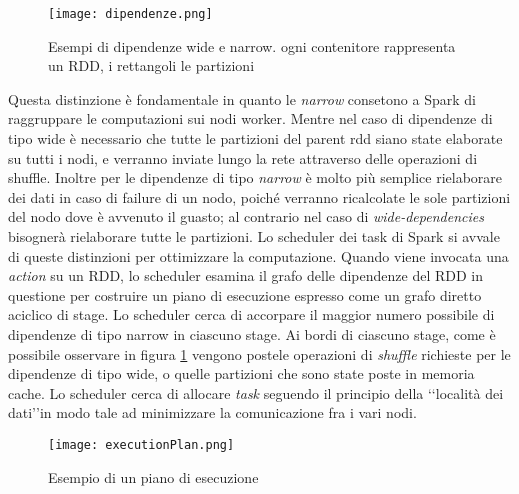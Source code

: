    \begin{figure}[h]
\centering
\texttt{[image: dipendenze.png]}
\caption{Esempi di dipendenze wide e narrow. ogni contenitore rappresenta un RDD, i rettangoli le partizioni}
\label{fig:exPlanSPark}
\end{figure} 
Questa distinzione è fondamentale in quanto le \emph{narrow} consetono a Spark di raggruppare le computazioni sui nodi worker.
Mentre nel caso di dipendenze di tipo wide è necessario che tutte le partizioni del parent rdd siano state elaborate su tutti i nodi, e verranno inviate lungo la rete attraverso delle operazioni di shuffle.
Inoltre per le dipendenze di tipo \emph{narrow} è molto più semplice rielaborare dei dati in caso di failure di un nodo, poiché verranno ricalcolate le sole partizioni del nodo dove è avvenuto il guasto; al contrario nel caso di \emph{wide-dependencies} bisognerà rielaborare tutte le partizioni.
Lo scheduler dei task di Spark si avvale di queste distinzioni per ottimizzare la computazione.
Quando viene invocata una \emph{action} su un RDD, lo scheduler esamina il grafo delle dipendenze del RDD in questione per costruire un piano di esecuzione espresso come un grafo diretto aciclico di stage. Lo scheduler cerca di accorpare il maggior numero possibile di  dipendenze di tipo narrow in ciascuno stage.
Ai bordi di ciascuno stage, come è possibile osservare in figura \ref{fig:exPlanSPark} vengono postele operazioni di \emph{shuffle} richieste per le dipendenze di tipo wide, o quelle partizioni che sono state poste in memoria cache. Lo scheduler cerca di allocare  \emph{task} seguendo il principio della \lq\lq località dei dati\rq\rq in modo tale ad minimizzare la comunicazione fra i vari nodi.


 
 
    \begin{figure}[h]
\centering
\texttt{[image: executionPlan.png]}
\caption{Esempio di un piano di esecuzione}
\label{fig:sparkDependencies}
\end{figure} 

 

